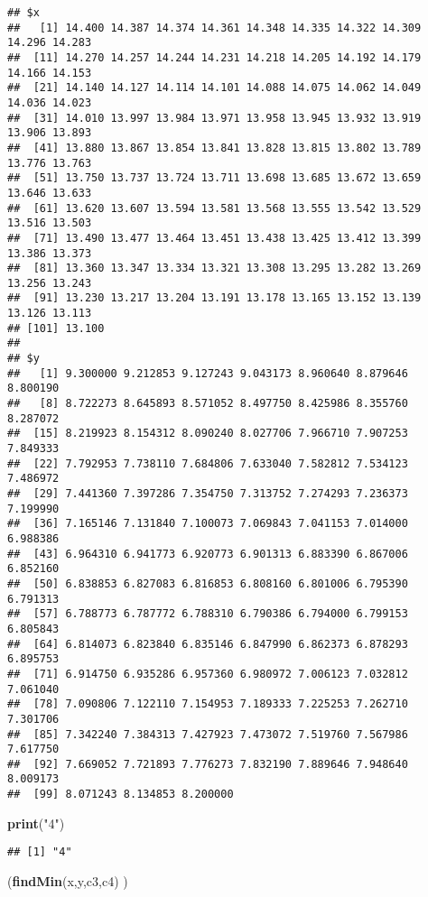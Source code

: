 \documentclass[]{article}
\newenvironment{Shaded}{\begin{snugshade}}{\end{snugshade}}
\newcommand{\KeywordTok}[1]{\textcolor[rgb]{0.13,0.29,0.53}{\textbf{#1}}}
\newcommand{\StringTok}[1]{\textcolor[rgb]{0.31,0.60,0.02}{#1}}
\newcommand{\NormalTok}[1]{#1}
\begin{document}
\begin{verbatim}
## $x
##   [1] 14.400 14.387 14.374 14.361 14.348 14.335 14.322 14.309 14.296 14.283
##  [11] 14.270 14.257 14.244 14.231 14.218 14.205 14.192 14.179 14.166 14.153
##  [21] 14.140 14.127 14.114 14.101 14.088 14.075 14.062 14.049 14.036 14.023
##  [31] 14.010 13.997 13.984 13.971 13.958 13.945 13.932 13.919 13.906 13.893
##  [41] 13.880 13.867 13.854 13.841 13.828 13.815 13.802 13.789 13.776 13.763
##  [51] 13.750 13.737 13.724 13.711 13.698 13.685 13.672 13.659 13.646 13.633
##  [61] 13.620 13.607 13.594 13.581 13.568 13.555 13.542 13.529 13.516 13.503
##  [71] 13.490 13.477 13.464 13.451 13.438 13.425 13.412 13.399 13.386 13.373
##  [81] 13.360 13.347 13.334 13.321 13.308 13.295 13.282 13.269 13.256 13.243
##  [91] 13.230 13.217 13.204 13.191 13.178 13.165 13.152 13.139 13.126 13.113
## [101] 13.100
## 
## $y
##   [1] 9.300000 9.212853 9.127243 9.043173 8.960640 8.879646 8.800190
##   [8] 8.722273 8.645893 8.571052 8.497750 8.425986 8.355760 8.287072
##  [15] 8.219923 8.154312 8.090240 8.027706 7.966710 7.907253 7.849333
##  [22] 7.792953 7.738110 7.684806 7.633040 7.582812 7.534123 7.486972
##  [29] 7.441360 7.397286 7.354750 7.313752 7.274293 7.236373 7.199990
##  [36] 7.165146 7.131840 7.100073 7.069843 7.041153 7.014000 6.988386
##  [43] 6.964310 6.941773 6.920773 6.901313 6.883390 6.867006 6.852160
##  [50] 6.838853 6.827083 6.816853 6.808160 6.801006 6.795390 6.791313
##  [57] 6.788773 6.787772 6.788310 6.790386 6.794000 6.799153 6.805843
##  [64] 6.814073 6.823840 6.835146 6.847990 6.862373 6.878293 6.895753
##  [71] 6.914750 6.935286 6.957360 6.980972 7.006123 7.032812 7.061040
##  [78] 7.090806 7.122110 7.154953 7.189333 7.225253 7.262710 7.301706
##  [85] 7.342240 7.384313 7.427923 7.473072 7.519760 7.567986 7.617750
##  [92] 7.669052 7.721893 7.776273 7.832190 7.889646 7.948640 8.009173
##  [99] 8.071243 8.134853 8.200000
\end{verbatim}

\begin{Shaded}
\begin{Highlighting}[]
\KeywordTok{print}\NormalTok{(}\StringTok{"4"}\NormalTok{)}
\end{Highlighting}
\end{Shaded}

\begin{verbatim}
## [1] "4"
\end{verbatim}

\begin{Shaded}
\begin{Highlighting}[]
\NormalTok{(}\KeywordTok{findMin}\NormalTok{(x,y,c3,c4) ) }
\end{Highlighting}
\end{Shaded}
\end{document}
